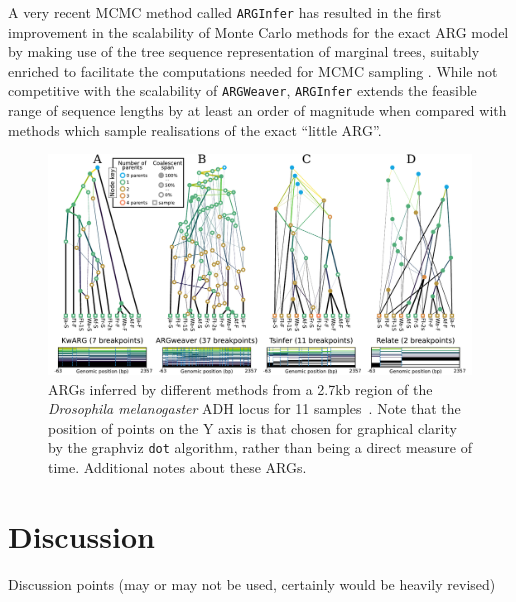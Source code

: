 \documentclass{article}
\begin{document}
A very recent MCMC method called \texttt{ARGInfer} has resulted in the first
improvement in the scalability of Monte Carlo methods for the exact ARG model
by making use of the tree sequence representation of marginal trees, suitably enriched
to facilitate the computations needed for MCMC sampling
\citep{mahmoudi2022bayesian}.
While not competitive with the scalability of \texttt{ARGWeaver}, \texttt{ARGInfer} extends
the feasible range of sequence lengths by at least an order of magnitude when
compared with methods which sample realisations of the exact ``little ARG''.


\begin{figure}
\begin{center}
    \includegraphics[width=\textwidth]{illustrations/inference.pdf}
\end{center}
\caption{\label{fig-inferred-args}
ARGs inferred by different methods from a 2.7kb region of the \textit{Drosophila melanogaster}
ADH locus for 11 samples~\citep{kreitman1983nucleotide}. Note that the position of points on the
Y axis is that chosen for graphical clarity by the graphviz \texttt{dot} algorithm,  rather than being
a direct measure of time. Additional notes about these ARGs.
}
\end{figure}

\section*{Discussion}

Discussion points (may or may not be used, certainly would be heavily revised)
\end{document}
